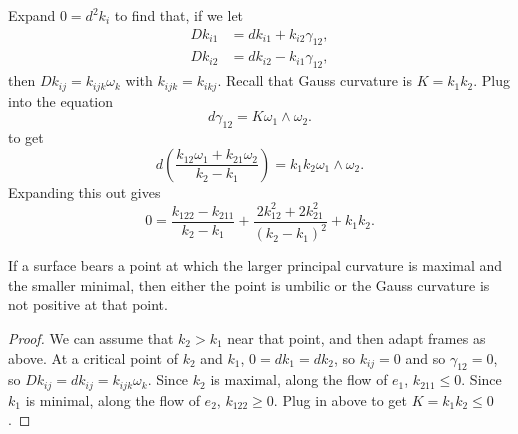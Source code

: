Expand \(0=d^2k_i\) to find that, if we let
\begin{align*}
Dk_{i1}&=dk_{i1}+k_{i2}\gamma_{12},\\
Dk_{i2}&=dk_{i2}-k_{i1}\gamma_{12},
\end{align*}
then
\(
Dk_{ij}=k_{ijk}\omega_k
\)
with \(k_{ijk}=k_{ikj}\).
Recall that Gauss curvature is \(K=k_1k_2\).
Plug into the equation
\[
d\gamma_{12}=K\omega_1\wedge\omega_2.
\]
to get
\[
d\left(
\frac{k_{12}\omega_1+k_{21}\omega_2}{k_2-k_1}
\right)
=
k_1k_2\omega_1\wedge\omega_2.
\]
Expanding this out gives
\[
0=
\frac{k_{122}-k_{211}}{k_2-k_1}
+\frac{2k^2_{12}+2k^2_{21}}{(k_2-k_1)^2}
+k_1k_2.
\]

\begin{lemma}\label{lemma:max.min.k}
If a surface bears a point at which the larger principal curvature is maximal and the smaller minimal, then either the point is umbilic or the Gauss curvature is not positive at that point.
\end{lemma}
\begin{proof}
We can assume that \(k_2>k_1\) near that point, and then adapt frames as above.
At a critical point of \(k_2\) and \(k_1\), \(0=dk_1=dk_2\), so \(k_{ij}=0\) and so \(\gamma_{12}=0\), so \(Dk_{ij}=dk_{ij}=k_{ijk}\omega_k\).
Since \(k_2\) is maximal, along the flow of \(e_1\), \(k_{211}\le 0\).
Since \(k_1\) is minimal, along the flow of \(e_2\), \(k_{122}\ge 0\).
Plug in above to get \(K=k_1k_2\le 0\).
\end{proof}

